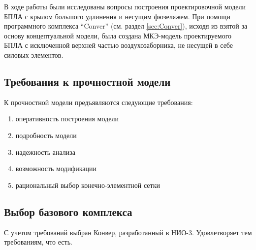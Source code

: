 
В ходе работы были исследованы вопросы построения проектировочной модели БПЛА с крылом большого удлинения и несущим фюзеляжем. При помощи программного комплекса ``Conver'' (см. раздел \ref{sec:Conver}), исходя из взятой за основу концептуальной модели, была создана МКЭ-модель проектируемого БПЛА с исключенной верхней частью воздухозаборника, не несущей в себе силовых элементов. 


\subsection{Требования к прочностной модели}

К прочностной модели предъявляются следующие требования:

\begin{enumerate}
\item оперативность построения модели
\item подробность модели
\item надежность анализа
\item возможность модификации 
\item рациональный выбор конечно-элементной сетки
\end{enumerate}

\subsection{Выбор базового комплекса}
С учетом требований выбран Конвер, разработанный в НИО-3. 
Удовлетворяет тем требованиям, что есть.



